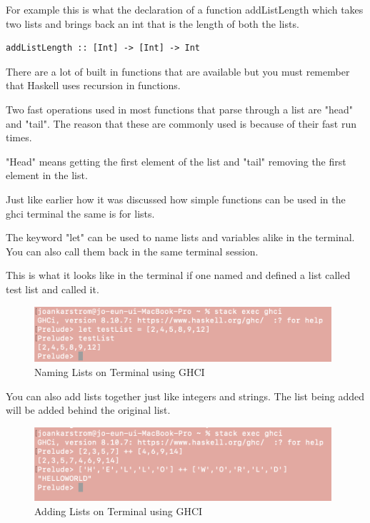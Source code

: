 \documentclass{article}
\begin{document}
\medskip\noindent
For example this is what the declaration of a function addListLength which takes two lists and brings back an int that is the length of both the lists. 

\medskip\noindent
\begin{lstlisting}
addListLength :: [Int] -> [Int] -> Int
\end{lstlisting}

\medskip\noindent
There are a lot of built in functions that are available but you must remember that Haskell uses recursion in functions. 

\medskip\noindent
Two fast operations used in most functions that parse through a list are "head" and "tail". The reason that these are commonly used is because of their fast run times.

\medskip\noindent
"Head" means getting the first element of the list and "tail" removing the first element in the list. 

\medskip\noindent
Just like earlier how it was discussed how simple functions can be used in the ghci terminal the same is for lists. 

\medskip\noindent
The keyword "let" can be used to name lists and variables alike in the terminal. You can also call them back in the same terminal session. 

\medskip\noindent
This is what it looks like in the terminal if one named and defined a list called test list and called it.

\medskip\noindent 
\begin{figure}[htp]
    \centering
    \includegraphics[width=11cm]{NameLists.png}
    \caption{Naming Lists on Terminal using GHCI}
    \label{fig:naming lists}
\end{figure}

\medskip\noindent
You can also add lists together just like integers and strings. The list being added will be added behind the original list.

\medskip\noindent 
\begin{figure}[htp]
    \centering
    \includegraphics[width=11cm]{NamingLists.png}
    \caption{Adding Lists on Terminal using GHCI}
    \label{fig:adding lists}
\end{figure}
\end{document}
